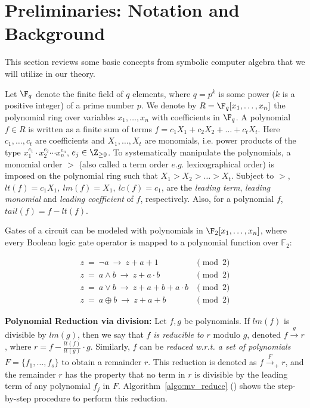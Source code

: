 \section{Preliminaries: Notation and Background}
\label{sec:prelim}
This section reviews some basic concepts from symbolic computer
algebra that we will utilize in our theory. 
\par Let $\F_q$ denote the finite field of $q$ elements, where $q=p^k$ is some 
power ($k$ is a positive integer) of a prime number $p$. We
denote by $R = \F_q[x_1, \dots, x_n]$
the  polynomial ring over variables $x_1, \dots, x_n$ with
coefficients in $\F_q$. A polynomial $f \in R$ is written as a finite sum of terms 
$f = c_1 X_1 +  c_2 X_2 + \dots + c_t X_t$.  Here $c_1, \dots, c_t$
are coefficients and $X_1, \dots, X_t$ are monomials, i.e. power
products of the type $x_1^{e_{1}}\cdot x_2^{e_{2}}\cdots x_n^{e_{n}}$, 
$e_j \in \Z_{\geq  0}$. To systematically manipulate the
polynomials, a monomial order $>$ (also called a term order $e.g.$ lexicographical 
order) is
imposed on the polynomial ring such that  $X_1 >X_2 > \dots >  X_t$.  Subject to
$>$, $lt(f) = c_1 X_1, ~lm(f) = X_1, ~lc(f) = c_1$, are the {\it
leading   term}, {\it   leading monomial} and {\it   leading
coefficient} of $f$, respectively. Also, for a polynomial $f$,
$tail(f) = f - lt(f)$.

\par Gates of a circuit can be modeled with polynomials in $\F_2[x_1,\dots,x_n]$, 
where every Boolean logic gate operator is mapped to a polynomial
function over ${\mathbb{F}}_2$: 

\begin{equation}
\label{bool2poly}
\begin{split}
z ~ =  ~ \neg a ~ \rightarrow ~ z+a+1 & \pmod 2  \\
z ~ =  ~ a \wedge b ~ \rightarrow ~ z+a \cdot b & \pmod 2\\
z ~ =  ~ a \vee b ~ \rightarrow ~ z+a+b+a \cdot b & \pmod 2 \\
z ~ =  ~ a \oplus b ~ \rightarrow ~ z+a+b & \pmod 2 
\end{split}
\end{equation}

\par {\bf Polynomial Reduction via division:} Let $f, g$ be polynomials. If $lm(f)$ is divisible by
$lm(g)$, then we say that $f$ {\it is reducible to} $r$ modulo $g$,
denoted $f \stackrel{g}{\textstyle\longrightarrow} r$, where $r = f - {\frac{lt(f)}{lt(g)}} \cdot g$. Similarly, $f$ can be {\it reduced 
w.r.t. a set of polynomials}  $F = \{f_1, \dots, f_s\}$ to obtain a
remainder $r$. This reduction is denoted as $f \stackrel{F} {\textstyle
  \longrightarrow}_+ r$, and the remainder $r$ has the property that
no term in $r$ is divisible by the leading term of any polynomial
$f_j$ in $F$. Algorithm~\ref{algo:mv_reduce} (\cite{gb_book}) shows the 
step-by-step procedure to perform this reduction.  

